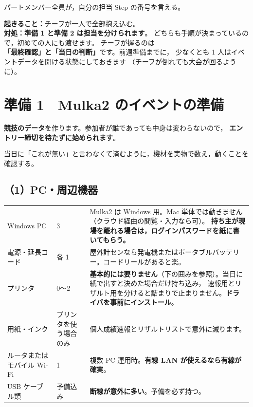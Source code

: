 \begin{Done}
パートメンバー全員が，自分の担当 Step の番号を言える。
\end{Done}

\begin{Fail}
\textbf{起きること：}チーフが一人で全部抱え込む。\\
\textbf{対処：}\textbf{準備 1 と準備 2 は担当を分けられます}。
どちらも手順が決まっているので，初めての人にも渡せます。
チーフが握るのは\textbf{「最終確認」と「当日の判断」}です。前週準備までに，
少なくとも 1 人はイベントデータを開ける状態にしておきます
（チーフが倒れても大会が回るように）。
\end{Fail}


\section{準備 1　Mulka2 のイベントの準備}

\textbf{競技のデータ}を作ります。参加者が誰であっても中身は変わらないので，
\textbf{エントリー締切を待たずに始められます}。


\begin{Goal}
当日に「これが無い」と言わなくて済むように，機材を実物で数え，動くことを確認する。
\end{Goal}

\subsection*{（1）PC・周辺機器}

\begin{center}
\small
\begin{tabular}{@{}P{40mm}P{12mm}P{92mm}@{}}
\toprule
{} &  &  \\
\midrule
Windows PC & 3 & Mulka2 は Windows 用。Mac 単体では動きません（クラウド経由の閲覧・入力なら可）。
  \textbf{持ち主が現場を離れる場合は，ログインパスワードを紙に書いてもらう。} \\
電源・延長コード & 各 1 & 屋外計センなら発電機またはポータブルバッテリー。コードリールがあると楽。 \\
プリンタ & 0〜2 & \textbf{基本的には要りません}（下の囲みを参照）。当日に紙で出すと決めた場合だけ持ち込み，
  速報用とリザルト用を分けると詰まりで止まりません。\textbf{ドライバを事前にインストール}。 \\
用紙・インク & プリンタを使う場合のみ & 個人成績速報とリザルトリストで意外に減ります。 \\
ルータまたはモバイル Wi-Fi & 1 & 複数 PC 運用時。\textbf{有線 LAN が使えるなら有線が確実}。 \\
USB ケーブル類 & 予備込み & \textbf{断線が意外に多い}。予備を必ず持つ。 \\
\bottomrule
\end{tabular}
\end{center}

